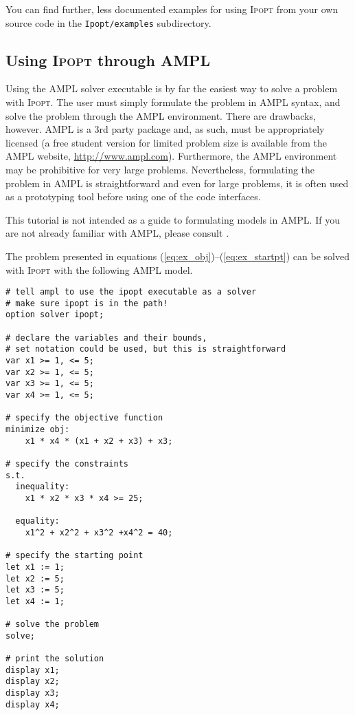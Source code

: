 \documentclass[10pt]{article}
\newcommand{\Ipopt}{\textsc{Ipopt}\xspace}
\begin{document}
You can find further, less documented examples for using \Ipopt from
your own source code in the {\tt Ipopt/examples} subdirectory.

\subsection{Using \Ipopt through AMPL} \label{sec.ipoptampl}
Using the AMPL solver executable is by far the easiest way to
solve a problem with \Ipopt. The user must simply formulate the problem
in AMPL syntax, and solve the problem through the AMPL environment.
There are drawbacks, however. AMPL is a 3rd party package and, as
such, must be appropriately licensed (a free student version for
limited problem size is available from the AMPL website,
\url{http://www.ampl.com}). Furthermore, the AMPL environment may be 
prohibitive for very large problems. Nevertheless, formulating the problem in 
AMPL is straightforward and even for large problems, it is often used as a
prototyping tool before using one of the code interfaces.

This tutorial is not intended as a guide to formulating models in
AMPL. If you are not already familiar with AMPL, please consult
\cite{FouGayKer:AMPLbook}.

The problem presented in equations
(\ref{eq:ex_obj})--(\ref{eq:ex_startpt}) can be solved with \Ipopt with
the following AMPL model.

\begin{verbatim}
# tell ampl to use the ipopt executable as a solver
# make sure ipopt is in the path!
option solver ipopt;

# declare the variables and their bounds, 
# set notation could be used, but this is straightforward
var x1 >= 1, <= 5; 
var x2 >= 1, <= 5; 
var x3 >= 1, <= 5; 
var x4 >= 1, <= 5;

# specify the objective function
minimize obj:
    x1 * x4 * (x1 + x2 + x3) + x3;
        
# specify the constraints
s.t.
  inequality:
    x1 * x2 * x3 * x4 >= 25;
                
  equality:
    x1^2 + x2^2 + x3^2 +x4^2 = 40;

# specify the starting point            
let x1 := 1;
let x2 := 5;
let x3 := 5;
let x4 := 1;

# solve the problem
solve;

# print the solution
display x1;
display x2;
display x3;
display x4;
\end{verbatim}
  
\end{document}
